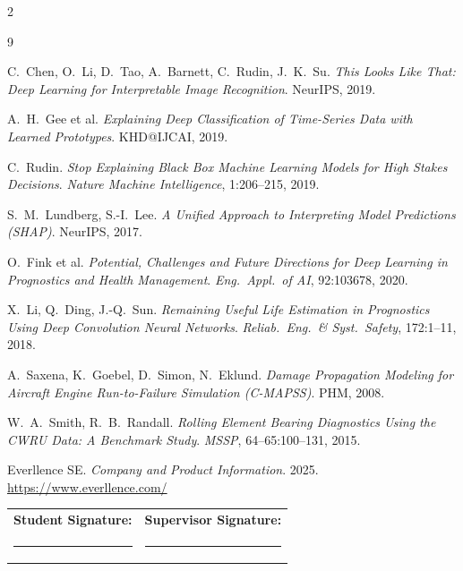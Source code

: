 \documentclass[10pt,a4paper]{article}
\begin{document}
{\footnotesize
\renewcommand{\refname}{}\vspace{-3.2em}
\begin{multicols}{2}
\raggedright
\begin{thebibliography}{9}\itemsep0pt

C.\ Chen, O.\ Li, D.\ Tao, A.\ Barnett, C.\ Rudin, J.\ K.\ Su.
\textit{This Looks Like That: Deep Learning for Interpretable Image Recognition}. NeurIPS, 2019.

A.\ H.\ Gee et al.
\textit{Explaining Deep Classification of Time-Series Data with Learned Prototypes}. KHD@IJCAI, 2019.

C.\ Rudin.
\textit{Stop Explaining Black Box Machine Learning Models for High Stakes Decisions}. \textit{Nature Machine Intelligence}, 1:206--215, 2019.

S.\ M.\ Lundberg, S.-I.\ Lee.
\textit{A Unified Approach to Interpreting Model Predictions (SHAP)}. NeurIPS, 2017.

O.\ Fink et al.
\textit{Potential, Challenges and Future Directions for Deep Learning in Prognostics and Health Management}. \textit{Eng.\ Appl.\ of AI}, 92:103678, 2020.

X.\ Li, Q.\ Ding, J.-Q.\ Sun.
\textit{Remaining Useful Life Estimation in Prognostics Using Deep Convolution Neural Networks}. \textit{Reliab.\ Eng.\ \& Syst.\ Safety}, 172:1--11, 2018.

A.\ Saxena, K.\ Goebel, D.\ Simon, N.\ Eklund.
\textit{Damage Propagation Modeling for Aircraft Engine Run-to-Failure Simulation (C-MAPSS)}. PHM, 2008.

W.\ A.\ Smith, R.\ B.\ Randall.
\textit{Rolling Element Bearing Diagnostics Using the CWRU Data: A Benchmark Study}. \textit{MSSP}, 64--65:100--131, 2015.

Everllence SE. \textit{Company and Product Information}. 2025. \url{https://www.everllence.com/}

\end{thebibliography}
\end{multicols}}

\vspace{0.4em}
\noindent
{\small
\begin{tabularx}{\textwidth}{X X}
\textbf{Student Signature:} & \textbf{Supervisor Signature:} \\[1.4em]
\rule{0.42\textwidth}{0.4pt} & \rule{0.42\textwidth}{0.4pt} \\
\end{tabularx}}
\end{document}
